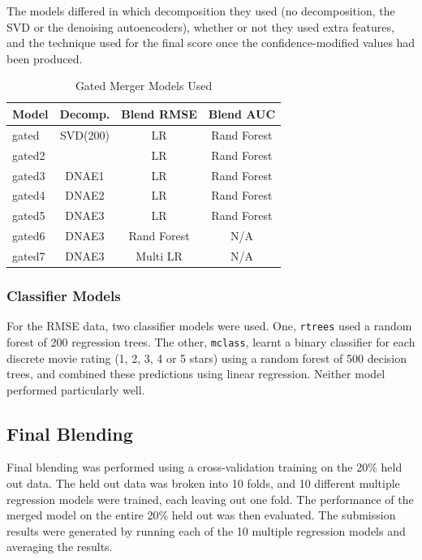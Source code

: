 \documentclass{article}
\begin{document}
The models differed in which decomposition they used (no decomposition, the SVD or the denoising autoencoders), whether or not they used extra features, and the technique used for the final score once the confidence-modified values had been produced.


\begin{table}
\caption{Gated Merger Models Used}
\label{table:gated-models}
\vskip 0.15in
\begin{center}
\begin{small}
\begin{sc}
\begin{tabular}{lccc}
\hline
\abovespace\belowspace
Model & Decomp. & Blend RMSE & Blend AUC \\
\hline
\abovespace
gated   & SVD(200)  & LR & Rand Forest  \\
gated2  &           & LR & Rand Forest  \\
gated3  & DNAE1     & LR & Rand Forest  \\
gated4  & DNAE2     & LR & Rand Forest  \\
gated5  & DNAE3     & LR & Rand Forest  \\
gated6  & DNAE3     & Rand Forest & N/A  \\
\belowspace
gated7  & DNAE3     & Multi LR & N/A   \\
\hline
\end{tabular}
\end{sc}
\end{small}
\end{center}
\vskip -0.1in
\end{table}

\subsubsection{Classifier Models}

For the RMSE data, two classifier models were used.  One, \texttt{rtrees} used a random forest of 200 regression trees.  The other, \texttt{mclass}, learnt a binary classifier for each discrete movie rating (1, 2, 3, 4 or 5 stars) using a random forest of 500 decision trees, and combined these predictions using linear regression.  Neither model performed particularly well.


\subsection{Final Blending}

Final blending was performed using a cross-validation training on the 20\% held out data.  The held out data was broken into 10 folds, and 10 different multiple regression models were trained, each leaving out one fold.  The performance of the merged model on the entire 20\% held out was then evaluated.  The submission results were generated by running each of the 10 multiple regression models and averaging the results.
\end{document}
